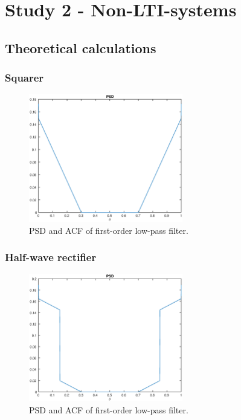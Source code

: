 
\section{Study 2 - Non-LTI-systems}



\subsection{Theoretical calculations}

\subsubsection{Squarer}

\begin{figure}[h]
\centering
\includegraphics[width=0.6\textwidth]{bilder/Lab2/Lab2fig1.eps}
\caption{PSD and ACF of first-order low-pass filter.}
\label{fig:Lab2fig1}
\end{figure}

\subsubsection{Half-wave rectifier}

\begin{figure}[h]
\centering
\includegraphics[width=0.6\textwidth]{bilder/Lab2/Lab2fig2.eps}
\caption{PSD and ACF of first-order low-pass filter.}
\label{fig:Lab1fig1}
\end{figure}

